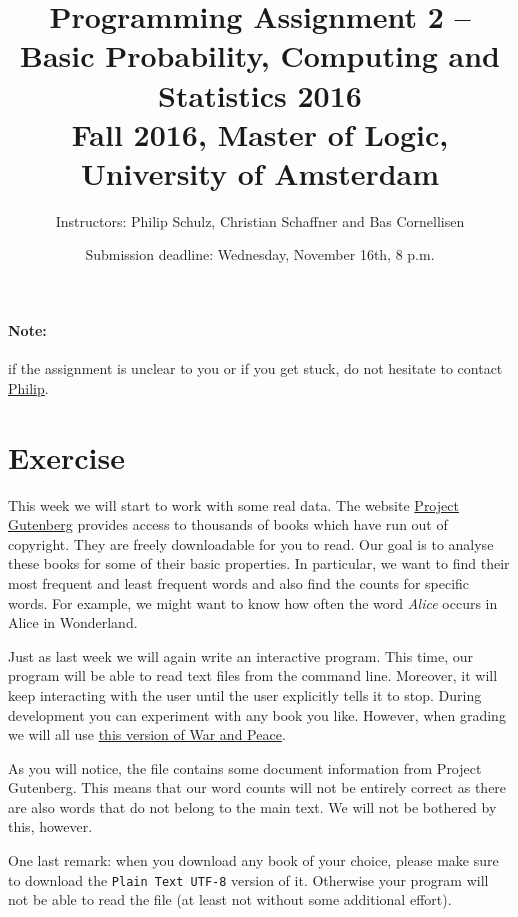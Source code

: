 \documentclass[11pt, leqno, a4paper]{article}
\title{Programming Assignment 2 -- Basic Probability, Computing and Statistics 2016 \\[2mm]
\large{Fall 2016, Master of Logic, University of Amsterdam}}
\author{Instructors: Philip Schulz, Christian Schaffner and Bas Cornellisen}
\date{Submission deadline: Wednesday, November 16th, 8 p.m.}
\begin{document}
\maketitle

\paragraph{Note:} if the assignment is unclear to you or if you get stuck, do not hesitate to contact \href{mailto:P.Schulz@uva.nl}{Philip}.

\section{Exercise}
This week we will start to work with some real data. The website \href{https://www.gutenberg.org/}{Project Gutenberg} provides access to thousands of
books which have run out of copyright. They are freely downloadable for you to read. Our goal is to analyse these books for some of their basic 
properties. In particular, we want to find their most frequent and least frequent words and also find the counts for specific words. For example,
we might want to know how often the word \textit{Alice} occurs in Alice in Wonderland.

Just as last week we will again write an interactive program. This time, our program will be able to read text files from the command line. 
Moreover, it will keep interacting with the user until the user explicitly tells it to stop. During development you can experiment
with any book you like. However, when grading we will all use \href{https://www.gutenberg.org/cache/epub/2600/pg2600.txt}{this version of War and Peace}.

As you will notice, the file contains some document information from Project Gutenberg. This means that our word counts will not be entirely correct as
there are also words that do not belong to the main text. We will not be bothered by this, however.

One last remark: when you download any book of your choice, please make sure to download the \texttt{Plain Text UTF-8} version of it. Otherwise your
program will not be able to read the file (at least not without some additional effort).
\end{document}
